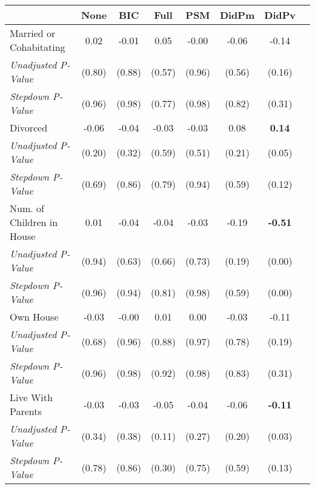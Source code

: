 \begin{tabular}{l c c c c c c c}
\toprule
 & None & BIC & Full & PSM & DidPm & DidPv \\
\midrule
Married or Cohabitating & 0.02 & -0.01 & 0.05 & -0.00 & -0.06 & -0.14 \\
\quad \textit{Unadjusted P-Value} & (0.80) & (0.88) & (0.57) & (0.96) & (0.56) & (0.16) \\
\quad \textit{Stepdown P-Value} & (0.96) & (0.98) & (0.77) & (0.98) & (0.82) & (0.31) \\
Divorced & -0.06 & -0.04 & -0.03 & -0.03 & 0.08 & \textbf{ 0.14 } \\
\quad \textit{Unadjusted P-Value} & (0.20) & (0.32) & (0.59) & (0.51) & (0.21) & (0.05) \\
\quad \textit{Stepdown P-Value} & (0.69) & (0.86) & (0.79) & (0.94) & (0.59) & (0.12) \\
Num. of Children in House & 0.01 & -0.04 & -0.04 & -0.03 & -0.19 & \textbf{ -0.51 } \\
\quad \textit{Unadjusted P-Value} & (0.94) & (0.63) & (0.66) & (0.73) & (0.19) & (0.00) \\
\quad \textit{Stepdown P-Value} & (0.96) & (0.94) & (0.81) & (0.98) & (0.59) & (0.00) \\
Own House & -0.03 & -0.00 & 0.01 & 0.00 & -0.03 & -0.11 \\
\quad \textit{Unadjusted P-Value} & (0.68) & (0.96) & (0.88) & (0.97) & (0.78) & (0.19) \\
\quad \textit{Stepdown P-Value} & (0.96) & (0.98) & (0.92) & (0.98) & (0.83) & (0.31) \\
Live With Parents & -0.03 & -0.03 & -0.05 & -0.04 & -0.06 & \textbf{ -0.11 } \\
\quad \textit{Unadjusted P-Value} & (0.34) & (0.38) & (0.11) & (0.27) & (0.20) & (0.03) \\
\quad \textit{Stepdown P-Value} & (0.78) & (0.86) & (0.30) & (0.75) & (0.59) & (0.13) \\
\bottomrule
\end{tabular}
